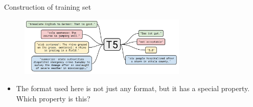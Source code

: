 

\begin{frame}{Construction of training set}

\vfill
	
	\begin{figure}
		\centering
		\includegraphics[width = 8cm]{figure/62-t5.png}\\ 
	\end{figure}

\pause

\begin{itemize}
    \item \ques The format used here is not just any
    format, but it has a special property. Which property is this?



\end{itemize}

\vfill

\end{frame}





